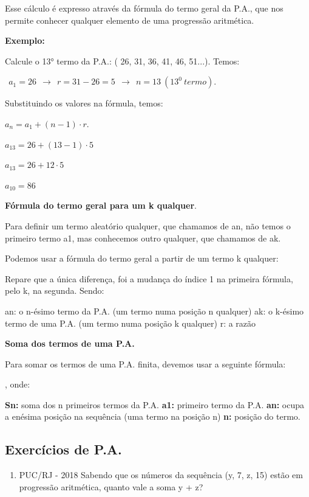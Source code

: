 \begin{multicols*}{2}
Esse cálculo é expresso através da fórmula do termo geral da P.A., que nos permite conhecer qualquer elemento de uma progressão aritmética.	

\textbf{Exemplo:}

Calcule o 13° termo da P.A.: ( 26, 31, 36, 41, 46, 51...). Temos:

\color{blue}$ \ \ a_1 = 26 \ \ \to \ \ r = 31 - 26 = 5 \ \ \to \ \ n = 13 \ (13^0 \ termo)$.

\color{black}Substituindo os valores na fórmula, temos:

\color{blue}$ a_n = a_1 + (n - 1) \cdot r $.

$ a_{13} = 26 + (13 - 1) \cdot 5 $

$ a_{13} = 26 + 12 \cdot 5 $

$ a_{10} = 86 $\color{black}

\textbf{Fórmula do termo geral para um k qualquer}.

Para definir um termo aleatório qualquer, que chamamos de an, não temos o primeiro termo a1, mas conhecemos outro qualquer, que chamamos de ak.

Podemos usar a fórmula do termo geral a partir de um termo k qualquer:


Repare que a única diferença, foi a mudança do índice 1 na primeira fórmula, pelo k, na segunda. Sendo:

an: o n-ésimo termo da P.A. (um termo numa posição n qualquer)
ak: o k-ésimo termo de uma P.A. (um termo numa posição k qualquer)
r: a razão

\textbf{Soma dos termos de uma P.A.}

Para somar os termos de uma P.A. finita, devemos usar a seguinte fórmula:

	, onde:

\textbf{Sn:} soma dos n primeiros termos da P.A.
\textbf{a1:} primeiro termo da P.A.
\textbf{an:} ocupa a enésima posição na sequência (uma termo na posição n)
\textbf{n:} posição do termo.

\subsection{Exercícios de P.A.}

\begin{enumerate}

\item PUC/RJ - 2018 Sabendo que os números da sequência (y, 7, z, 15) estão em progressão aritmética, quanto vale a soma y + z?


\end{enumerate}
\end{multicols*}

